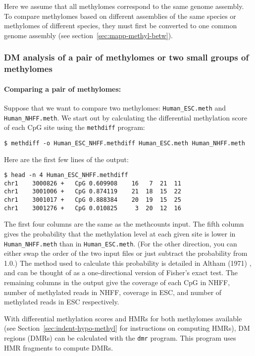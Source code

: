 \documentclass[10pt]{article}
\newcommand{\prog}[1]{\texttt{#1}}
\newcommand{\fn}[1]{\texttt{#1}}
\begin{document}
Here we assume that all methylomes correspond to the same genome 
assembly. To compare methylomes based on different assemblies of the 
same species or methylomes of different species, they must first be 
converted to one common genome assembly (see 
section~\ref{sec:mapp-methyl-betw}).

\subsubsection{DM analysis of a pair of methylomes or two small groups of 
			   methylomes}

\paragraph{Comparing a pair of methylomes:} 
Suppose that we want to compare two methylomes: {\tt Human\_ESC.meth} and 
{\tt Human\_NHFF.meth}. We start out by calculating the differential 
methylation score of each CpG site using the \prog{methdiff} program:
{\small{%
\begin{verbatim}
$ methdiff -o Human_ESC_NHFF.methdiff Human_ESC.meth Human_NHFF.meth
\end{verbatim}%
}}
Here are the first few lines of the output:
{\small{%
\begin{verbatim}
$ head -n 4 Human_ESC_NHFF.methdiff
chr1	3000826	+	CpG	0.609908	16	 7	21	11
chr1	3001006	+	CpG	0.874119	21	18	15	22
chr1	3001017	+	CpG	0.888384	20	19	15	25
chr1	3001276	+	CpG	0.010825	 3	20	12	16
\end{verbatim}%
}}

The first four columns are the same as the methcounts input. The fifth 
column gives the probability that the methylation level at each given 
site is lower in \fn{Human\_NHFF.meth} than in \fn{Human\_ESC.meth}. 
(For the other direction, you can either swap the order of the two 
input files or just subtract the probability from 1.0.) The method used 
to calculate this probability is detailed in Altham (1971) 
\cite{altham1969exact}, and can be thought of as a one-directional 
version of Fisher's exact test.  The remaining columns in the output 
give the coverage of each CpG in NHFF, number of methylated reads in 
NHFF, coverage in ESC, and number of methylated reads in ESC 
respectively.

With differential methylation scores and HMRs for both methylomes 
available (see Section~\ref{sec:indent-hypo-methyl} for instructions 
on computing HMRs), DM regions (DMRs) can be calculated with the 
\prog{dmr} program. This program uses HMR fragments to compute 
DMRs.
\end{document}
